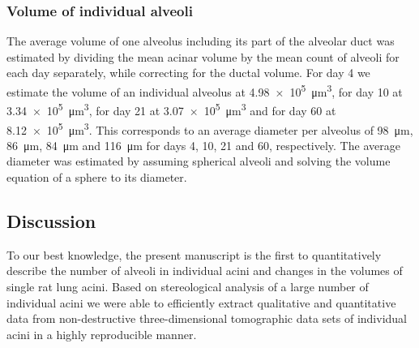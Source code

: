 \documentclass[
  american,
]{article}
\begin{document}
\hypertarget{volume-of-individual-alveoli}{%
\subsubsection{Volume of individual alveoli}\label{volume-of-individual-alveoli}}

The average volume of one alveolus including its part of the alveolar duct was estimated by dividing the mean acinar volume by the mean count of alveoli for each day separately, while correcting for the ductal volume.
For day 4 we estimate the volume of an individual alveolus at 4.98~×~10\textsuperscript{5}~μm\textsuperscript{3}, for day 10 at 3.34~×~10\textsuperscript{5}~μm\textsuperscript{3}, for day 21 at 3.07~×~10\textsuperscript{5}~μm\textsuperscript{3} and for day 60 at 8.12~×~10\textsuperscript{5}~μm\textsuperscript{3}.
This corresponds to an average diameter per alveolus of 98~μm, 86~μm, 84~μm and 116~μm for days 4, 10, 21 and 60, respectively.
The average diameter was estimated by assuming spherical alveoli and solving the volume equation of a sphere to its diameter.

\hypertarget{discussion}{%
\subsection{Discussion}\label{discussion}}

To our best knowledge, the present manuscript is the first to quantitatively describe the number of alveoli in individual acini and changes in the volumes of single rat lung acini.
Based on stereological analysis of a large number of individual acini we were able to efficiently extract qualitative and quantitative data from non-destructive three-dimensional tomographic data sets of individual acini in a highly reproducible manner.
\end{document}
